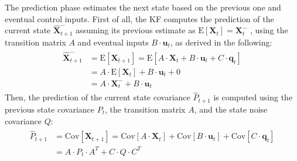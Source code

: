The prediction phase estimates the next state based on the previous one and eventual control inputs.%
First of all, the \gls{KF} computes the prediction of the current state $\hat{\mathbf{X}}_{t+1}^-$ assuming its previous estimate as  $\text{E}[\mathbf{X}_{t}] = \mathbf{X}_{t}^-$ , using the transition matrix $A$ and eventual inputs $B \cdot \mathbf{u}_t$, as derived in the following:%
\begin{align}
\begin{split}
\hat{\mathbf{X}}_{t+1}^- & = \text{E}[\mathbf{X}_{t+1}] = \text{E}[ A \cdot \mathbf{X}_t + B \cdot \mathbf{u}_t + C \cdot  \mathbf{q}_t] \\
& =  A \cdot \text{E}[\mathbf{X}_t] + B \cdot \mathbf{u}_t + 0 \\
& =  A \cdot \mathbf{X}_t^- + B \cdot \mathbf{u}_t
  \label{eq:pred-state}
\end{split}
\end{align}
Then, the prediction of the current state covariance $\hat{P}_{t+1}$ is computed using the previous state covariance $P_t$, the transition matrix $A$, and the state noise covariance $Q$:%
    \begin{align}
\begin{split}
    	\label{eq:pred-cov-p}
        \hat{P}_{t+1} & = \text{Cov}[\mathbf{X}_{t+1}] = \text{Cov}[A \cdot \mathbf{X}_t] + \text{Cov}[B \cdot \mathbf{u}_t] + \text{Cov}[C \cdot \mathbf{q}_t] \\ & = A \cdot P_t \cdot A^T + C \cdot Q \cdot C^T %
\end{split}
    \end{align}


